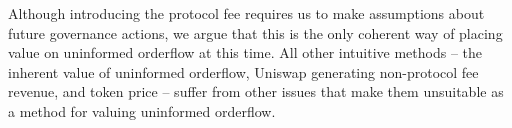     Although introducing the protocol fee requires us to make assumptions about future governance actions, we argue that this is the only coherent way of placing value on uninformed orderflow at this time. All other intuitive methods -- the inherent value of uninformed orderflow, Uniswap generating non-protocol fee revenue, and token price -- suffer from other issues that make them unsuitable as a method for valuing uninformed orderflow.